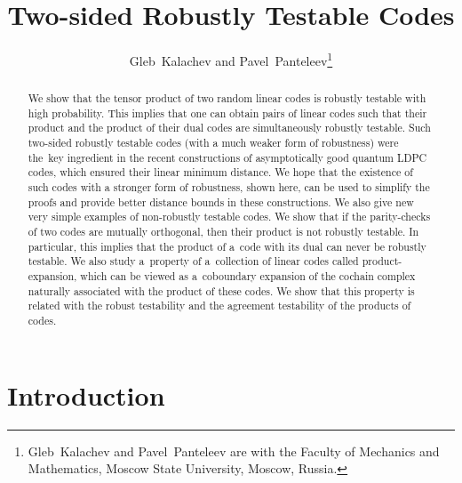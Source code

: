 \documentclass[11pt]{article}
\theoremstyle{plain}
\theoremstyle{definition}
\theoremstyle{remark}
\begin{document}
\title{Two-sided Robustly Testable Codes}
\author{Gleb~Kalachev and Pavel~Panteleev\thanks{Gleb~Kalachev and Pavel~Panteleev are with the Faculty of Mechanics and Mathematics, Moscow State University, Moscow, Russia.%
}}

\setcounter{page}{1}
\maketitle


\begin{abstract}
  We show that the tensor product of two random linear codes is robustly testable with high probability. This implies that one can obtain pairs of linear codes such that their product and the product of their dual codes are simultaneously robustly testable. Such two-sided robustly testable codes (with a much weaker form of robustness) were the~key ingredient in the recent constructions of asymptotically good quantum LDPC codes, which ensured their linear minimum distance. We hope that the existence of such codes with a stronger form of robustness, shown here, can be used to simplify the proofs and provide better distance bounds in these constructions. We also give new very simple examples of non-robustly testable codes. We show that if the parity-checks of two codes are mutually orthogonal, then their product is not robustly testable. In particular, this implies that the product of a~code with its dual can never be robustly testable. We also study a~property of a~collection of linear codes called product-expansion, which can be viewed as a~coboundary expansion of the cochain complex naturally associated with the product of these codes. We show that this property is related with the robust testability and the agreement testability of the products of codes. 
\end{abstract}

\section{Introduction}
\end{document}
